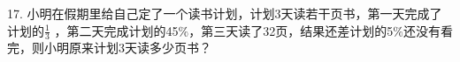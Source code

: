 17.	小明在假期里给自己定了一个读书计划，计划3天读若干页书，第一天完成了计划的$\frac{1}{3}$ ，第二天完成计划的45$\%$，第三天读了32页，结果还差计划的5$\%$还没有看完，则小明原来计划3天读多少页书？



